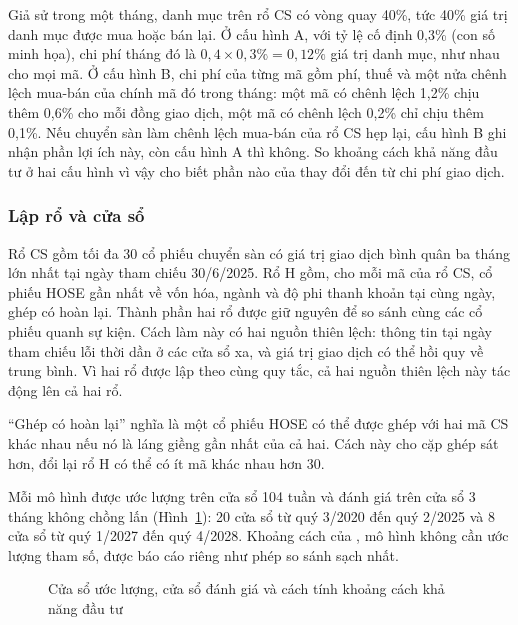 \begin{vidu}
Giả sử trong một tháng, danh mục  trên rổ CS có vòng quay 40\%, tức 40\% giá trị danh mục được mua hoặc bán lại. Ở cấu hình A, với tỷ lệ cố định 0,3\% (con số minh họa), chi phí tháng đó là $0{,}4 \times 0{,}3\% = 0{,}12\%$ giá trị danh mục, như nhau cho mọi mã. Ở cấu hình B, chi phí của từng mã gồm phí, thuế và một nửa chênh lệch mua-bán của chính mã đó trong tháng: một mã có chênh lệch 1,2\% chịu thêm 0,6\% cho mỗi đồng giao dịch, một mã có chênh lệch 0,2\% chỉ chịu thêm 0,1\%. Nếu chuyển sàn làm chênh lệch mua-bán của rổ CS hẹp lại, cấu hình B ghi nhận phần lợi ích này, còn cấu hình A thì không. So khoảng cách khả năng đầu tư ở hai cấu hình vì vậy cho biết phần nào của thay đổi đến từ chi phí giao dịch.
\end{vidu}

\subsubsection*{Lập rổ và cửa sổ}

Rổ CS gồm tối đa 30 cổ phiếu chuyển sàn có giá trị giao dịch bình quân ba tháng lớn nhất tại ngày tham chiếu 30/6/2025. Rổ H gồm, cho mỗi mã của rổ CS, cổ phiếu HOSE gần nhất về vốn hóa, ngành và độ phi thanh khoản tại cùng ngày, ghép có hoàn lại. Thành phần hai rổ được giữ nguyên để so sánh cùng các cổ phiếu quanh sự kiện. Cách làm này có hai nguồn thiên lệch: thông tin tại ngày tham chiếu lỗi thời dần ở các cửa sổ xa, và giá trị giao dịch có thể hồi quy về trung bình. Vì hai rổ được lập theo cùng quy tắc, cả hai nguồn thiên lệch này tác động lên cả hai rổ.

\enquote{Ghép có hoàn lại} nghĩa là một cổ phiếu HOSE có thể được ghép với hai mã CS khác nhau nếu nó là láng giềng gần nhất của cả hai. Cách này cho cặp ghép sát hơn, đổi lại rổ H có thể có ít mã khác nhau hơn 30.

Mỗi mô hình được ước lượng trên cửa sổ 104 tuần và đánh giá trên cửa sổ 3 tháng không chồng lấn (Hình~\ref{fig:cuaso}): 20 cửa sổ từ quý 3/2020 đến quý 2/2025 và 8 cửa sổ từ quý 1/2027 đến quý 4/2028. Khoảng cách của , mô hình không cần ước lượng tham số, được báo cáo riêng như phép so sánh sạch nhất.

\begin{figure}[H]
\myfloatalign
{}
\caption{Cửa sổ ước lượng, cửa sổ đánh giá và cách tính khoảng cách khả năng đầu tư}\label{fig:cuaso}
\end{figure}

